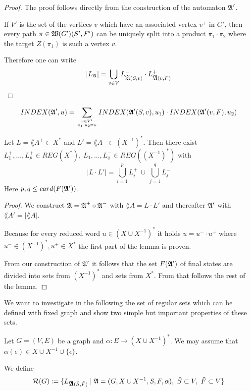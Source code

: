 \begin{proof}
The proof follows directly from the construction of the automaton $\mbox{$\mathfrak{A}$}'$.

If $V'$ is the set of the vertices $v$ which have an associated vertex $v^+$ in
$G'$, then every path $\pi \in \mbox{$\mathfrak{W}(G')$}(S', F')$ can be uniquely split into
a product $\pi_1 \cdot \pi_2$ where the target $Z(\pi_1)$ is such a vertex $v$.

Therefore one can write
\[ |\mbox{$L_{\mathfrak{A}}$}| = \bigcup_{v \in V} L_{\mbox{$\mathfrak{A}$}(S, v)}^- \cdot L_{\mbox{$\mathfrak{A}$}(v, F)}^+
\]
\end{proof}

\begin{corollary}
\[ INDEX(\mbox{$\mathfrak{A}$}', u) = \sum_{v \in V' \atop u_1 \cdot u_2 = u}
INDEX(\mbox{$\mathfrak{A}$}'(S, v), u_1) \cdot INDEX(\mbox{$\mathfrak{A}$}'(v, F), u_2) \]
\end{corollary}

\begin{lemma}
Let $L = \lang{A}^+ \subset X^*$ and $L' = \lang{A}^- \subset (X^{-1})^*$. Then
there exist $L_1^+,\ldots,L_p^+ \in REG(X^*),\ L_1,\ldots,L_q^- \in
REG((X^{-1})^*)$ with
\[ |L \cdot L'| = \bigcup_{i=1}^{p} L_i^+ \ \cup\ \bigcup_{j=1}^{q} L_j^- \]
Here $p, q \leq card(F(\mbox{$\mathfrak{A'}$}))$.
\end{lemma}

\begin{proof}
We construct $\mbox{$\mathfrak{A}$} = \mbox{$\mathfrak{A}$}^+ \circ \mbox{$\mathfrak{A}$}^-$ with $\lang{A} = L \cdot L'$ and
thereafter $\mbox{$\mathfrak{A'}$}$ with $\lang{A'} = |\lang{A}|$.

Because for every reduced word $u \in (X\cup X^{-1})^*$ it holds $u = u^- \cdot
u^+$ where $u^- \in (X^{-1})^*, u^+ \in X^*$ the first part of the lemma is
proven.

From our construction of $\mbox{$\mathfrak{A'}$}$ it follows that the set $F(\mbox{$\mathfrak{A'}$})$ of final
states are divided into sets from $(X^{-1})^*$ and sets from $X^*$. From that
follows the rest of the lemma.
\end{proof}

We want to investigate in the following the set of regular sets which can be
defined with fixed graph and show two simple but important properties of these
sets.

Let $G = (V, E)$ be a graph and $\alpha : E \to (X \cup X^{-1})^*$. We may
assume that $\alpha(e) \in X \cup X^{-1} \cup \{\epsilon\}$.

We define
\[ \mathcal{R}(G) := \{ L_{\mbox{$\mathfrak{A}$}(\tilde{S},\tilde{F})} \mid \mbox{$\mathfrak{A}$} = (G, X \cup
X^{-1}, S, F, \alpha),\ \tilde{S} \subset V,\ \tilde{F} \subset V \} \]

